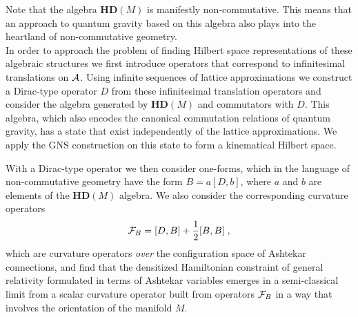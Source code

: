 \documentclass[12pt]{article}
\def\oo{\omega}
\def\ca{{\cal A}}
\def\cf{{\cal F}}
\begin{document}
Note that the algebra $\mathbf{HD}(M)$ is manifestly non-commutative. This means that an approach to quantum gravity based on this algebra also plays into the heartland of non-commutative geometry. \\


In order to approach the problem of finding Hilbert space representations of these algebraic structures we first introduce operators that correspond to infinitesimal translations on $\ca$. %
Using infinite sequences of lattice approximations we construct a Dirac-type operator $D$ from these infinitesimal translation operators and consider the algebra generated by $\mathbf{HD}(M)$ and commutators with $D$. This algebra, which also encodes the canonical commutation relations of quantum gravity, has a state that exist independently of the lattice approximations. We apply the GNS construction on this state to form a kinematical Hilbert space.

With a Dirac-type operator we then consider one-forms, which in the language of non-commutative geometry have the form $B= a[D,b]$, where $a$ and $b$ are elements of the $\mathbf{HD}(M)$ algebra. %
We also consider the corresponding curvature operators
$$
\cf_{B} = [D,B_{}] + \frac{1}{2}[B_{},B_{}]\;,%
$$
which are curvature operators {\it over} the configuration space of Ashtekar connections, and find that the densitized Hamiltonian constraint of general relativity formulated in terms of Ashtekar variables emerges in a semi-classical limit from a scalar curvature operator built from operators $\cf_B$ in a way that involves the orientation of the manifold $M$.\\


\end{document}
